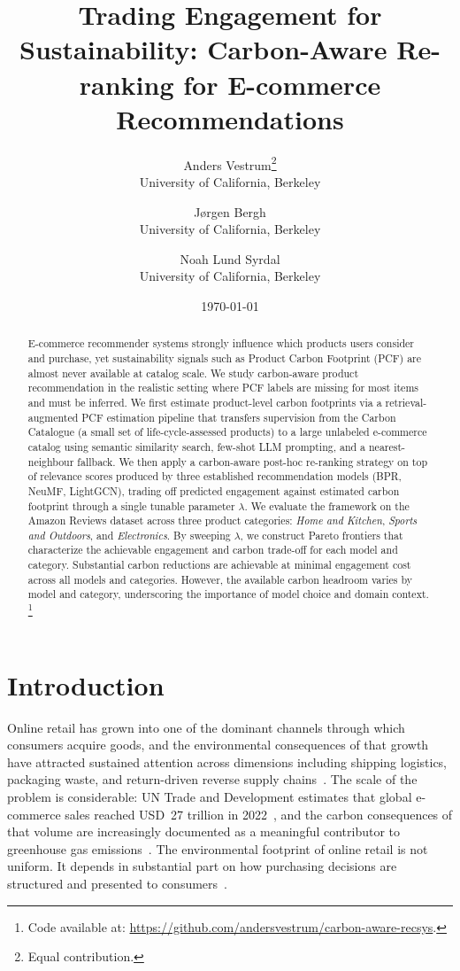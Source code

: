 \documentclass[11pt]{article}
\title{\textbf{Trading Engagement for Sustainability: Carbon-Aware Re-ranking for E-commerce Recommendations}}
\author{
Anders Vestrum\thanks{Equal contribution.} \\
University of California, Berkeley
\and
Jørgen Bergh\footnotemark[1] \\
University of California, Berkeley
\and
Noah Lund Syrdal\footnotemark[1] \\
University of California, Berkeley
}
\date{%
\today
}
\begin{document}
\maketitle

\begin{abstract}

E-commerce recommender systems strongly influence which products users consider and purchase, yet sustainability signals such as Product Carbon Footprint (PCF) are almost never available at catalog scale. We study carbon-aware product recommendation in the realistic setting where PCF labels are missing for most items and must be inferred. We first estimate product-level carbon footprints via a retrieval-augmented PCF estimation pipeline that transfers supervision from the Carbon Catalogue (a small set of life-cycle-assessed products) to a large unlabeled e-commerce catalog using semantic similarity search, few-shot LLM prompting, and a nearest-neighbour fallback. We then apply a carbon-aware post-hoc re-ranking strategy on top of relevance scores produced by three established recommendation models (BPR, NeuMF, LightGCN), trading off predicted engagement against estimated carbon footprint through a single tunable parameter $\lambda$. We evaluate the framework on the Amazon Reviews dataset across three product categories: \textit{Home and Kitchen}, \textit{Sports and Outdoors}, and \textit{Electronics}. By sweeping $\lambda$, we construct Pareto frontiers that characterize the achievable engagement and carbon trade-off for each model and category. Substantial carbon reductions are achievable at minimal engagement cost across
all models and categories. However, the available carbon headroom varies by model
and category, underscoring the importance of model choice and domain context. \footnote{Code available at: \url{https://github.com/andersvestrum/carbon-aware-recsys}.}

\end{abstract}

\section{Introduction}
\label{sec:introduction}

Online retail has grown into one of the dominant channels through which consumers acquire
goods, and the environmental consequences of that growth have attracted sustained attention
across dimensions including shipping logistics, packaging waste, and return-driven reverse
supply chains~\cite{olah2023sustainable}. The scale of the problem is considerable: UN
Trade and Development estimates that global e-commerce sales reached USD~27 trillion in
2022~\cite{unctad2024ecommerce}, and the carbon consequences of that volume are
increasingly documented as a meaningful contributor to greenhouse gas
emissions~\cite{buldeorai2023ecommerce}. The environmental footprint of online retail is
not uniform. It depends in substantial part on how purchasing decisions are structured and
presented to consumers~\cite{buldeorai2023ecommerce}.
\end{document}
